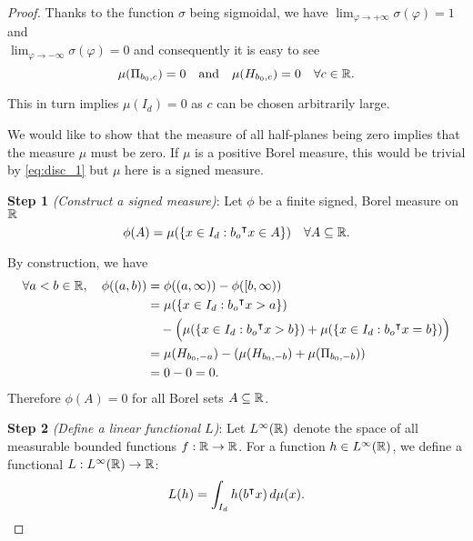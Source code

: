 \begin{proof}
    Thanks to the function $\sigma$ being sigmoidal, we have $\lim_{\varphi\to
    +\infty} \sigma(\varphi)= 1$ and \\ $\lim_{\varphi\to -\infty}
    \sigma(\varphi)=0$ and consequently it is easy to see
    \begin{equation}
        \label{eq:disc_1}
        \mu(\Pi_{b_0, c}) = 0 \quad \text{and} \quad \mu (H_{b_0, c}) = 0 
        \quad \forall c\in\mathbb{R}.
    \end{equation}

    This in turn implies $\mu(I_d) = 0$ as $c$ can be chosen arbitrarily large.
    
    We would like to show that the measure of all half-planes being zero implies
    that the measure $\mu$ must be zero. If $\mu$ is a positive Borel measure,
    this would be trivial by \eqref{eq:disc_1} but $\mu$ here is a signed
    measure.
    
    \textbf{Step 1} \textit{(Construct a signed measure)}: Let $\phi$ be a
    finite signed, Borel measure on $\mathbb{R}$
    \begin{equation}
        \label{eq:disc_2}
        \phi(A) = \mu(\{x \in I_d: b_o{}^{\intercal} x \in A\}) \quad \forall A \subseteq \mathbb{R}.
    \end{equation}

    By construction, we have
    \begin{align}
        \forall a < b \in \mathbb{R}, \quad \phi((a,b)) 
        &= \phi((a,\infty)) - \phi([b, \infty)) \\
        &= \mu(\{x \in I_d: b_o{}^{\intercal} x > a\}) \\
        &\quad- \Big(
            \mu(\{x \in I_d: b_o{}^{\intercal} x > b\})
            + \mu(\{x \in I_d: b_o{}^{\intercal} x = b\})
        \Big) \\
        &= \mu(H_{b_0, -a}) - (\mu(H_{b_0, -b}) + \mu(\Pi_{b_0, -b})) \\
        &= 0 - 0 = 0.
    \end{align}
    Therefore $\phi(A) = 0$ for all Borel sets $A \subseteq \mathbb{R}$.

    \textbf{Step 2} \textit{(Define a linear functional $L$)}: Let
    $L^{\infty}(\mathbb{R})$ denote the space of all measurable bounded functions $f:
    \mathbb{R} \to \mathbb{R}$. For a function $h \in L^{\infty}(\mathbb{R})$, we define a functional
    $L: L^{\infty}(\mathbb{R}) \to \mathbb{R}$:
    \begin{equation}
        L(h) = \int_{I_d} h(b{}^{\intercal} x)\,d\mu(x).
    \end{equation}


\end{proof}
